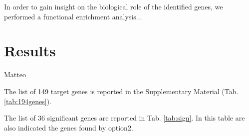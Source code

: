\documentclass[fleqn,10pt]{SelfArx} %
\begin{document}
In order to gain insight on the biological role of the identified genes, we performed a functional enrichment analysis...


\section*{Results}
Matteo

The list of 149 target genes is reported in the Supplementary Material (Tab. \ref{tab:194genes}).

The list of 36 significant genes are reported in Tab. \ref{tab:sign}. In this table are also indicated the genes found by option2.

\renewcommand{\arraystretch}{1.1}

\end{document}

